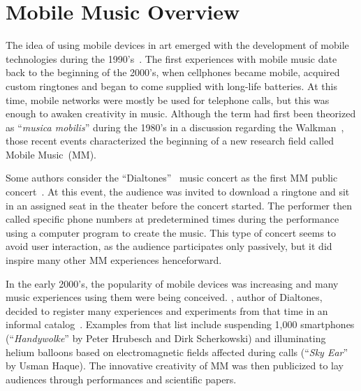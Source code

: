 \chapter{Mobile Music Overview}
\label{cap:mobilemusic}


The idea of using mobile devices in art emerged with the development of mobile technologies during the 1990's~\citep{deSouzaeSilva2004}.
The first experiences with mobile music date back to the beginning of the 2000's, when cellphones became mobile, acquired custom ringtones and began to come supplied with long-life batteries.
At this time, mobile networks were mostly be used for telephone calls, but this was enough to awaken creativity in music.
Although the term had first been theorized as ``\textit{musica mobilis}'' during the 1980's in a discussion regarding the Walkman~\citep[p.~5--6]{Gopinath2014handbookmobilemusicstudies1}, those recent events characterized the beginning of a new research field called Mobile Music~(MM).

Some authors consider the ``Dialtones''~\citep{Levin2001} music concert as the first MM public concert~\citep{Wang2014ocarina,Weinberg2005interconnected}.
At this event, the audience was invited to download a ringtone and sit in an assigned seat in the theater before the concert started.
The performer then called specific phone numbers at predetermined times during the performance using a computer program to create the music.
This type of concert seems to avoid user interaction, as the audience participates only passively, but it did inspire many other MM experiences henceforward.

In the early 2000's, the popularity of mobile devices was increasing and many music experiences using them were being conceived.
\citeauthor{Levin2004}, author of Dialtones, decided to register many experiences and experiments from that time in an informal catalog~\citep{Levin2004}.
Examples from that list include suspending 1,000 smartphones (``\textit{Handywolke}'' by Peter Hrubesch and Dirk Scherkowski) and illuminating helium balloons based on electromagnetic fields affected during calls (``\textit{Sky Ear}'' by Usman Haque).
The innovative creativity of MM was then publicized to lay audiences through performances and scientific papers.

